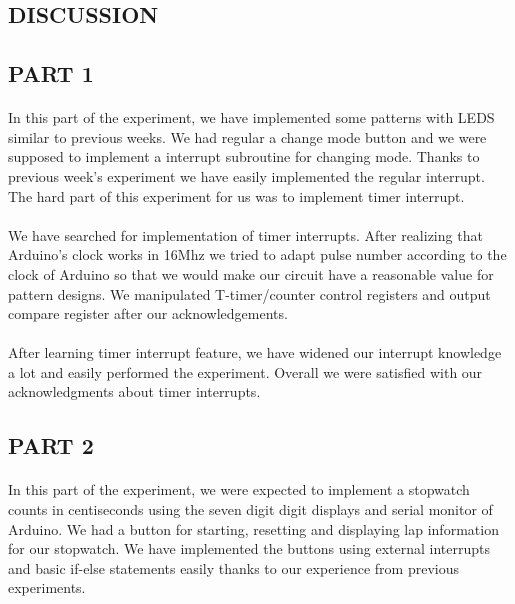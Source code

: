 \documentclass[pdftex,12pt,a4paper]{article}
\begin{document}
\begin{flushleft}
\newpage
\section{DISCUSSION}
\subsection{PART 1}
\paragraph{}
In this part of the experiment, we have implemented some patterns with LEDS similar to previous weeks. We had regular a change mode button and we were supposed to implement a interrupt subroutine for changing mode. Thanks to previous week's experiment we have easily implemented the regular interrupt. The hard part of this experiment for us was to implement timer interrupt. 
\paragraph{}
We have searched for implementation of timer interrupts. After realizing that Arduino's clock works in 16Mhz we tried to adapt pulse number according to the clock of Arduino so that we would make our circuit have a reasonable value for pattern designs. We manipulated T-timer/counter control registers and output compare register after our acknowledgements.
\paragraph{}
After learning timer interrupt feature, we have widened our interrupt knowledge a lot and easily performed the experiment. Overall we were satisfied with our acknowledgments about timer interrupts.

\subsection{PART 2} 

\paragraph{}
In this part of the experiment, we were expected to implement a stopwatch counts in centiseconds using the seven digit digit displays and serial monitor of Arduino. We had a button for starting, resetting and displaying lap information for our stopwatch. We have implemented the buttons using external interrupts and basic if-else statements easily thanks to our experience from previous experiments.

\end{flushleft}
\end{document}
